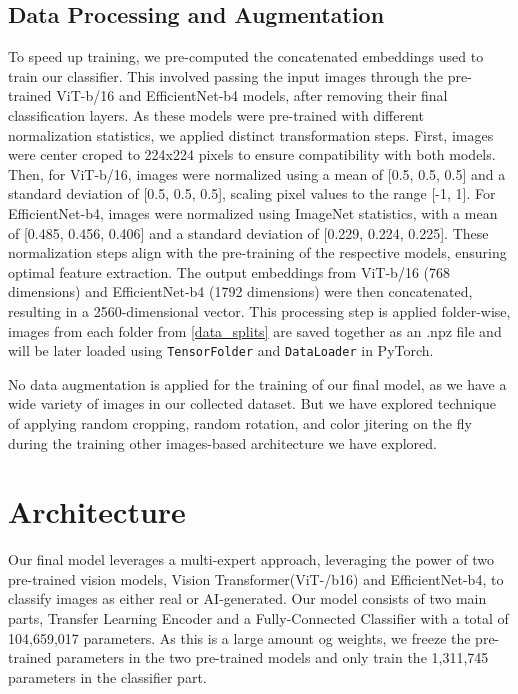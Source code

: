 \documentclass{article} %
\begin{document}
\subsection{Data Processing and Augmentation}

To speed up training, we pre-computed the concatenated embeddings used to train our classifier. This involved passing the input images through the pre-trained ViT-b/16 and EfficientNet-b4 models, after removing their final classification layers. As these models were pre-trained with different normalization statistics, we applied distinct transformation steps. First, images were center croped to 224x224 pixels to ensure compatibility with both models. Then, for ViT-b/16, images were normalized using a mean of [0.5, 0.5, 0.5] and a standard deviation of [0.5, 0.5, 0.5], scaling pixel values to the range [-1, 1]. For EfficientNet-b4, images were normalized using ImageNet statistics, with a mean of [0.485, 0.456, 0.406] and a standard deviation of [0.229, 0.224, 0.225]. These normalization steps align with the pre-training of the respective models, ensuring optimal feature extraction. The output embeddings from ViT-b/16 (768 dimensions) and EfficientNet-b4 (1792 dimensions) were then concatenated, resulting in a 2560-dimensional vector. This processing step is applied folder-wise, images from each folder from \ref{data_splits} are saved together as an .npz file and will be later loaded using \texttt{TensorFolder} and \texttt{DataLoader} in PyTorch.

No data augmentation is applied for the training of our final model, as we have a wide variety of images in our collected dataset. But we have explored technique of applying random cropping, random rotation, and color jitering on the fly during the training other images-based architecture we have explored.

\section{Architecture}

Our final model leverages a multi-expert approach, leveraging  the power of two pre-trained vision models, Vision Transformer(ViT-/b16) and EfficientNet-b4, to classify images as either real or AI-generated. Our model consists of two main parts, Transfer Learning Encoder and a Fully-Connected Classifier with a total of 104,659,017 parameters. As this is a large amount og weights, we  freeze the pre-trained parameters in the two pre-trained models and only train the 1,311,745 parameters in the classifier part.
\end{document}
